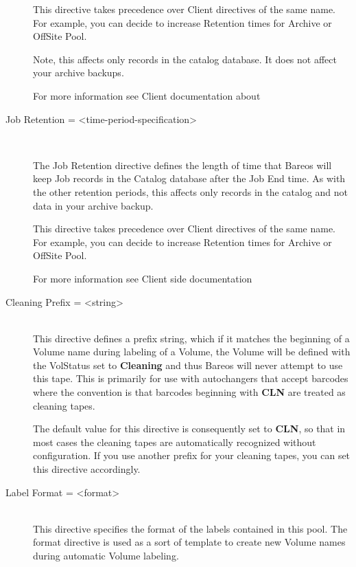 \begin{description}
This directive takes precedence over Client directives of the same name. For
example, you can decide to increase Retention times for Archive or OffSite
Pool.

Note, this affects only records in the catalog database. It does not affect
your archive backups.

For more information see Client documentation about

\item [Job Retention = {\textless}time-period-specification{\textgreater}] \hfill \\

The Job Retention directive defines the length of time that Bareos will keep
Job records in the Catalog database after the Job End time.  As with the
other retention periods, this affects only records in the catalog and not
data in your archive backup.

This directive takes precedence over Client directives of the same name.
For example, you can decide to increase Retention times for Archive or
OffSite Pool.

For more information see Client side documentation

\item [Cleaning Prefix = {\textless}string{\textgreater}] \hfill \\
This directive defines a prefix string, which if it matches the
beginning of a Volume name during labeling of a Volume, the Volume will
be defined with the VolStatus set to {\bf Cleaning} and thus Bareos will
never attempt to use this tape.  This is primarily for use with
autochangers that accept barcodes where the convention is that barcodes
beginning with {\bf CLN} are treated as cleaning tapes.

The default value for this directive is consequently set to {\bf CLN}, so
that in most cases the cleaning tapes are automatically recognized without
configuration.
If you use another prefix for your cleaning tapes, you can set this directive
accordingly.

\label{Label}
\item [Label Format = {\textless}format{\textgreater}] \hfill \\
This directive specifies the format of the labels contained in this
pool.  The format directive is used as a sort of template to create new
Volume names during automatic Volume labeling.


\end{description}
